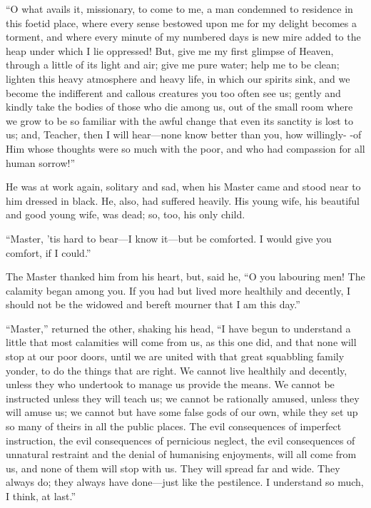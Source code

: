 ``O what avails it, missionary, to come to me, a man condemned to
residence in this foetid place, where every sense bestowed upon me
for my delight becomes a torment, and where every minute of my
numbered days is new mire added to the heap under which I lie
oppressed!  But, give me my first glimpse of Heaven, through a
little of its light and air; give me pure water; help me to be
clean; lighten this heavy atmosphere and heavy life, in which our
spirits sink, and we become the indifferent and callous creatures
you too often see us; gently and kindly take the bodies of those who
die among us, out of the small room where we grow to be so familiar
with the awful change that even its sanctity is lost to us; and,
Teacher, then I will hear---none know better than you, how willingly-%
-of Him whose thoughts were so much with the poor, and who had
compassion for all human sorrow!''

He was at work again, solitary and sad, when his Master came and
stood near to him dressed in black.  He, also, had suffered heavily.
His young wife, his beautiful and good young wife, was dead; so,
too, his only child.

``Master, 'tis hard to bear---I know it---but be comforted.  I would
give you comfort, if I could.''

The Master thanked him from his heart, but, said he, ``O you
labouring men!  The calamity began among you.  If you had but lived
more healthily and decently, I should not be the widowed and bereft
mourner that I am this day.''

``Master,'' returned the other, shaking his head, ``I have begun to
understand a little that most calamities will come from us, as this
one did, and that none will stop at our poor doors, until we are
united with that great squabbling family yonder, to do the things
that are right.  We cannot live healthily and decently, unless they
who undertook to manage us provide the means.  We cannot be
instructed unless they will teach us; we cannot be rationally
amused, unless they will amuse us; we cannot but have some false
gods of our own, while they set up so many of theirs in all the
public places.  The evil consequences of imperfect instruction, the
evil consequences of pernicious neglect, the evil consequences of
unnatural restraint and the denial of humanising enjoyments, will
all come from us, and none of them will stop with us.  They will
spread far and wide.  They always do; they always have done---just
like the pestilence.  I understand so much, I think, at last.''

